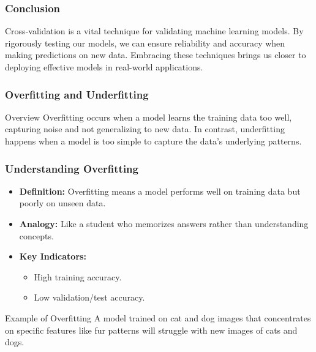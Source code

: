 \documentclass[aspectratio=169]{beamer}
\begin{document}
\begin{frame}[fragile]
    \frametitle{Conclusion}
    Cross-validation is a vital technique for validating machine learning models. By rigorously testing our models, we can ensure reliability and accuracy when making predictions on new data. Embracing these techniques brings us closer to deploying effective models in real-world applications.
\end{frame}

\begin{frame}[fragile]
    \frametitle{Overfitting and Underfitting}

    \begin{block}{Overview}
        Overfitting occurs when a model learns the training data too well, capturing noise and not generalizing to new data. In contrast, underfitting happens when a model is too simple to capture the data's underlying patterns. 
    \end{block}
\end{frame}

\begin{frame}[fragile]
    \frametitle{Understanding Overfitting}

    \begin{itemize}
        \item \textbf{Definition:} 
        Overfitting means a model performs well on training data but poorly on unseen data.
        \item \textbf{Analogy:} 
        Like a student who memorizes answers rather than understanding concepts.
        \item \textbf{Key Indicators:}
        \begin{itemize}
            \item High training accuracy.
            \item Low validation/test accuracy.
        \end{itemize}
    \end{itemize}

    \begin{block}{Example of Overfitting}
        A model trained on cat and dog images that concentrates on specific features like fur patterns will struggle with new images of cats and dogs.
    \end{block}
\end{frame}
\end{document}

